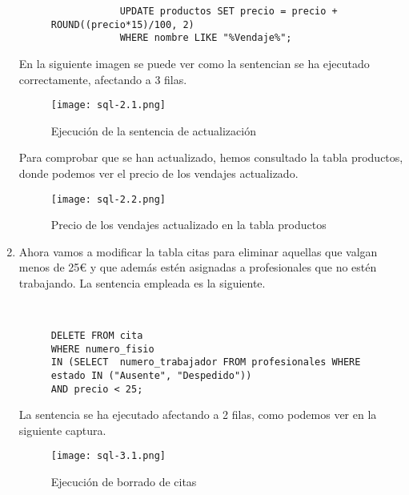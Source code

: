\begin{enumerate}
\begin{figure}[H]
\begin{tcolorbox}[sharp corners, colback=yellow!30, colframe=white!20]
\begin{verbatim}
            UPDATE productos SET precio = precio + ROUND((precio*15)/100, 2)
            WHERE nombre LIKE "%Vendaje%";
            \end{verbatim}
        \end{tcolorbox}
    \end{figure}

    En la siguiente imagen se puede ver como la sentencian se ha ejecutado correctamente, afectando a 3 filas.

    \begin{figure}[H]
        \centering
        \texttt{[image: sql-2.1.png]}
        \caption{Ejecución de la sentencia de actualización}
    \end{figure}

    Para comprobar que se han actualizado, hemos consultado la tabla productos, donde podemos ver el precio de los vendajes actualizado.

     \begin{figure}[H]
        \centering
        \texttt{[image: sql-2.2.png]}
        \caption{Precio de los vendajes actualizado en la tabla productos}
    \end{figure}

    \item Ahora vamos a modificar la tabla citas para eliminar aquellas que valgan menos de 25€ y que además estén asignadas a profesionales que no estén trabajando. La sentencia empleada es la siguiente.


    \begin{figure}[H]
        \begin{tcolorbox}[sharp corners, colback=yellow!30, colframe=white!20]
            \scriptsize
            \begin{verbatim}


DELETE FROM cita
WHERE numero_fisio
IN (SELECT  numero_trabajador FROM profesionales WHERE estado IN ("Ausente", "Despedido"))
AND precio < 25;
            \end{verbatim}
        \end{tcolorbox}
    \end{figure}

    La sentencia se ha ejecutado afectando a 2 filas, como podemos ver en la siguiente captura.

    \begin{figure}[H]
        \centering
        \texttt{[image: sql-3.1.png]}
        \caption{Ejecución de borrado de citas}
    \end{figure}


\end{enumerate}
